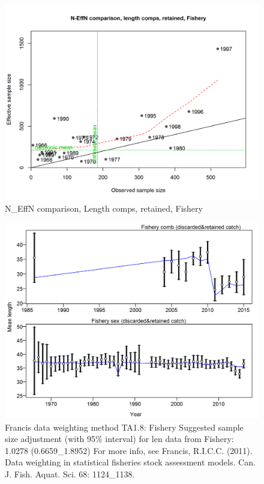 \documentclass[12pt,]{article}
\begin{document}
\begin{figure}
\centering
\includegraphics{./r4ss/plots_mod1/comp_lenfit_sampsize_flt1mkt2.png}
\caption{N\_EffN comparison, Length comps, retained, Fishery
\label{fig:mod1_8_comp_lenfit_sampsize_flt1mkt2}}
\end{figure}

\begin{figure}
\centering
\includegraphics{./r4ss/plots_mod1/comp_lenfit_data_weighting_TA1.8_Fishery.png}
\caption{Francis data weighting method TA1.8: Fishery Suggested sample
size adjustment (with 95\% interval) for len data from Fishery: 1.0278
(0.6659\_1.8952) For more info, see Francis, R.I.C.C. (2011). Data
weighting in statistical fisheries stock assessment models. Can. J.
Fish. Aquat. Sci. 68: 1124\_1138.
\label{fig:mod1_9_comp_lenfit_data_weighting_TA1.8_Fishery}}
\end{figure}
\end{document}
